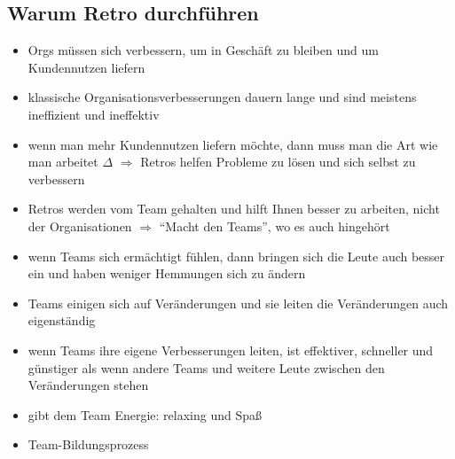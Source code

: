 \subsection{Warum Retro durchführen}
\begin{itemize}
  \item Orgs müssen sich verbessern, um in Geschäft zu bleiben und um Kundennutzen
    liefern
  \item klassische Organisationsverbesserungen dauern lange und sind meistens ineffizient und
    ineffektiv
  \item wenn man mehr Kundennutzen liefern möchte, dann muss man die Art wie man arbeitet
    $\Delta$ $\Rightarrow$  Retros helfen Probleme zu lösen und sich selbst zu verbessern
  \item Retros werden vom Team gehalten und hilft Ihnen besser zu arbeiten, nicht der
    Organisationen $\Rightarrow$ \enquote{Macht den Teams}, wo es auch hingehört
  \item wenn Teams sich ermächtigt fühlen, dann bringen sich die Leute auch besser ein und haben weniger Hemmungen sich zu ändern
  \item Teams einigen sich auf Veränderungen und sie leiten die Veränderungen auch eigenständig
  \item wenn Teams ihre eigene Verbesserungen leiten, ist effektiver, schneller und günstiger als
    wenn andere Teams und weitere Leute zwischen den Veränderungen stehen
  \item gibt dem Team Energie: relaxing und Spaß
  \item Team-Bildungsprozess
\end{itemize}


